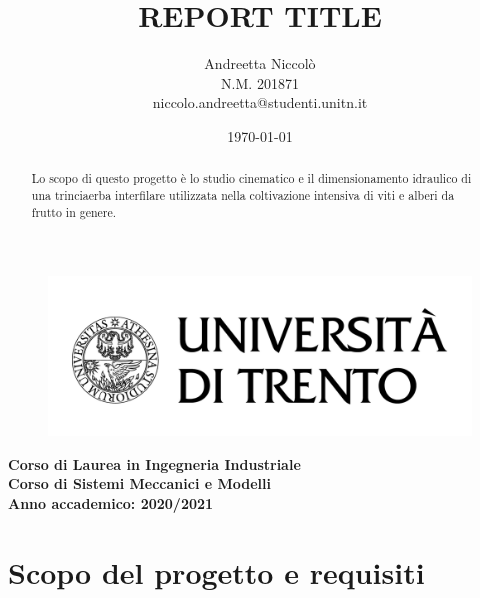 \documentclass[a4paper,12pt]{article}
\title{\textbf{REPORT TITLE}}
\author{Andreetta Niccolò\\
N.M. 201871\\
niccolo.andreetta@studenti.unitn.it
}
\date{\today}
\begin{document}
\begin{figure}[H]
    \centering
    \includegraphics[scale=0.15]{immagini/logo-unitn.png}
    \maketitle
\end{figure}
\begin{center}\textbf{
    Corso di Laurea in Ingegneria Industriale\\
    Corso di {Sistemi Meccanici e Modelli}\\
    Anno accademico: 2020/2021}
\vspace{2cm}
\begin{abstract}\centering
Lo scopo di questo progetto è lo studio cinematico e il dimensionamento idraulico di una trinciaerba interfilare utilizzata nella coltivazione intensiva di viti e alberi da frutto in genere.
\end{abstract}
\end{center}
\thispagestyle{empty}
\newpage
\tableofcontents
\listoffigures
\thispagestyle{empty}
\newpage
\setcounter{page}{3}
\section{Scopo del progetto e requisiti }
\end{document}
